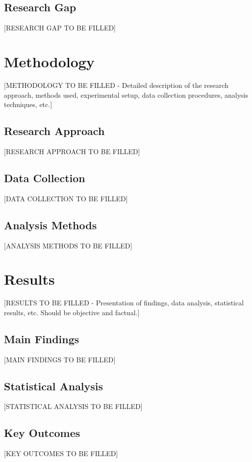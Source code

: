 \documentclass[11pt,a4paper]{article}
\begin{document}
	\subsection{Research Gap}
	[RESEARCH GAP TO BE FILLED]
	
	\section{Methodology}
	
	[METHODOLOGY TO BE FILLED - Detailed description of the research approach, methods used, experimental setup, data collection procedures, analysis techniques, etc.]
	
	\subsection{Research Approach}
	[RESEARCH APPROACH TO BE FILLED]
	
	\subsection{Data Collection}
	[DATA COLLECTION TO BE FILLED]
	
	\subsection{Analysis Methods}
	[ANALYSIS METHODS TO BE FILLED]
	
	\section{Results}
	
	[RESULTS TO BE FILLED - Presentation of findings, data analysis, statistical results, etc. Should be objective and factual.]
	
	\subsection{Main Findings}
	[MAIN FINDINGS TO BE FILLED]
	
	\subsection{Statistical Analysis}
	[STATISTICAL ANALYSIS TO BE FILLED]
	
	\subsection{Key Outcomes}
	[KEY OUTCOMES TO BE FILLED]
	
\end{document}
